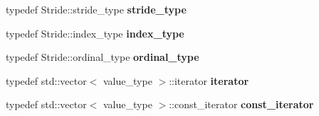 \begin{DoxyCompactItemize}
\item 
\hypertarget{classbtas_1_1_tensor_3_01_t_00_010ul_00_01_order_01_4_a0da2cb3ee4bd30c2d20c5e615f606a87}{
typedef Stride::stride\_\-type {\bfseries stride\_\-type}}
\label{classbtas_1_1_tensor_3_01_t_00_010ul_00_01_order_01_4_a0da2cb3ee4bd30c2d20c5e615f606a87}

\item 
\hypertarget{classbtas_1_1_tensor_3_01_t_00_010ul_00_01_order_01_4_a5ba35599514de5f36e3a6ee4d1434792}{
typedef Stride::index\_\-type {\bfseries index\_\-type}}
\label{classbtas_1_1_tensor_3_01_t_00_010ul_00_01_order_01_4_a5ba35599514de5f36e3a6ee4d1434792}

\item 
\hypertarget{classbtas_1_1_tensor_3_01_t_00_010ul_00_01_order_01_4_a970d0e95209b1edf67378d914426987c}{
typedef Stride::ordinal\_\-type {\bfseries ordinal\_\-type}}
\label{classbtas_1_1_tensor_3_01_t_00_010ul_00_01_order_01_4_a970d0e95209b1edf67378d914426987c}

\item 
\hypertarget{classbtas_1_1_tensor_3_01_t_00_010ul_00_01_order_01_4_a9ed37576221905a144bec33641d78411}{
typedef std::vector$<$ value\_\-type $>$::iterator {\bfseries iterator}}
\label{classbtas_1_1_tensor_3_01_t_00_010ul_00_01_order_01_4_a9ed37576221905a144bec33641d78411}

\item 
\hypertarget{classbtas_1_1_tensor_3_01_t_00_010ul_00_01_order_01_4_a1ec81ac0d71edfb63c655b3d1fd07ab3}{
typedef std::vector$<$ value\_\-type $>$::const\_\-iterator {\bfseries const\_\-iterator}}
\label{classbtas_1_1_tensor_3_01_t_00_010ul_00_01_order_01_4_a1ec81ac0d71edfb63c655b3d1fd07ab3}

\end{DoxyCompactItemize}
